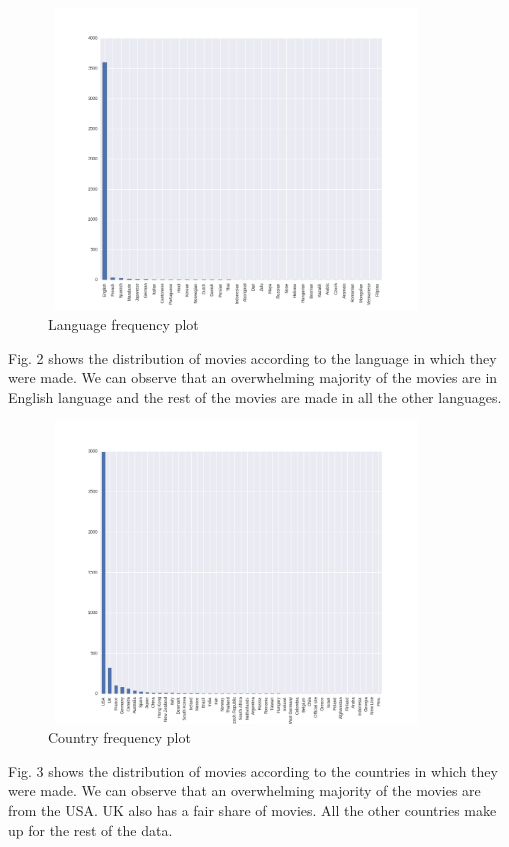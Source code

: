 \documentclass[conference]{IEEEtran}
\begin{document}
\begin{figure}[H]
  \centering	
  \captionsetup{justification=centering}
  \includegraphics[height=8cm, width=10cm, trim={20mm 0mm 10mm 20mm},clip]{../visualizations/Language-Histogram}
  \caption{Language frequency plot}
  \label{fig:fig2}
\end{figure}
Fig. 2 shows the distribution of movies according to the language in which they were made. We can observe that an overwhelming majority of the movies are in English language and the rest of the movies are made in all the other languages.

\begin{figure}[H]
  \centering	
  \captionsetup{justification=centering}
  \includegraphics[height=8cm, width=10cm, trim={20mm 0mm 10mm 20mm},clip]{../visualizations/Country-Histogram.png}
  \caption{Country frequency plot}
  \label{fig:fig3}
\end{figure}
Fig. 3 shows the distribution of movies according to the countries in which they were made. We can observe that an overwhelming majority of the movies are from the USA. UK also has a fair share of movies. All  the other countries make up for the rest of the data.
\end{document}
